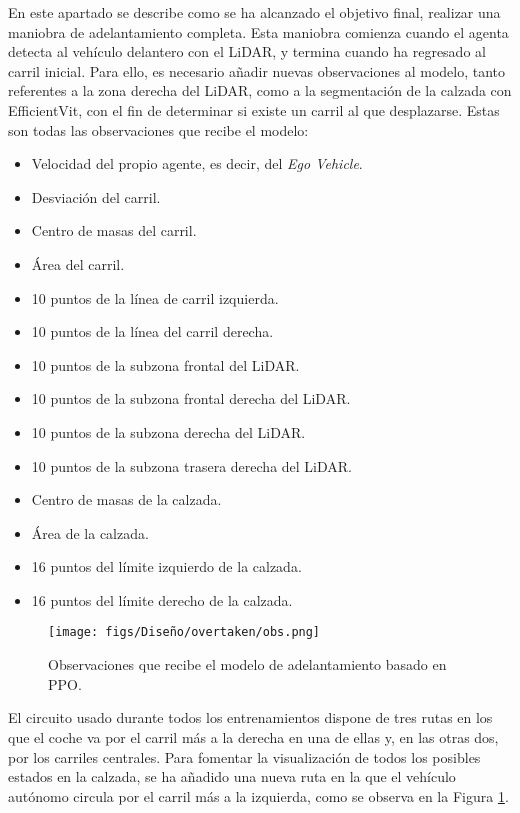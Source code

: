 En este apartado se describe como se ha alcanzado el objetivo final, realizar una maniobra de adelantamiento completa. Esta maniobra comienza cuando el agenta detecta al vehículo delantero con el \ac{LiDAR}, y termina cuando ha regresado al carril inicial. Para ello, es necesario añadir nuevas observaciones al modelo, tanto referentes a la zona derecha del \ac{LiDAR}, como a la segmentación de la calzada con EfficientVit, con el fin de determinar si existe un carril al que desplazarse. Estas son todas las observaciones que recibe el modelo:
\begin{itemize}
\item Velocidad del propio agente, es decir, del \textit{Ego Vehicle}.
\item Desviación del carril.
\item Centro de masas del carril.
\item Área del carril.
\item 10 puntos de la línea de carril izquierda.
\item 10 puntos de la línea del carril derecha.
\item 10 puntos de la subzona frontal del \ac{LiDAR}.
\item 10 puntos de la subzona frontal derecha del \ac{LiDAR}.
\item 10 puntos de la subzona derecha del \ac{LiDAR}.
\item 10 puntos de la subzona trasera derecha del \ac{LiDAR}.
\item Centro de masas de la calzada.
\item Área de la calzada.
\item 16 puntos del límite izquierdo de la calzada.
\item 16 puntos del límite derecho de la calzada.
\end{itemize}

\begin{figure}[ht]
\centering
\texttt{[image: figs/Diseño/overtaken/obs.png]}
\caption{Observaciones que recibe el modelo de adelantamiento basado en \ac{PPO}.}
\label{fig:obs_overtaken}
\end{figure}

El circuito usado durante todos los entrenamientos dispone de tres rutas en los que el coche va por el carril más a la derecha en una de ellas y, en las otras dos, por los carriles centrales. Para fomentar la visualización de todos los posibles estados en la calzada, se ha añadido una nueva ruta en la que el vehículo autónomo circula por el carril más a la izquierda, como se observa en la Figura \ref{fig:obs_overtaken}.

